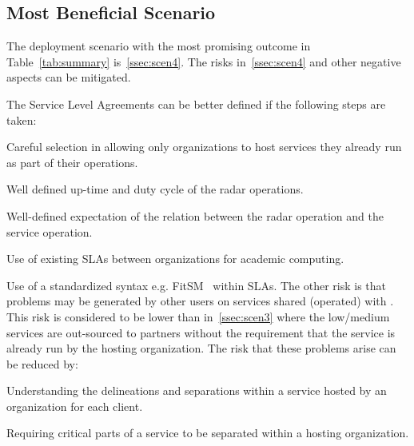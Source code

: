 \documentclass[12pt,a4paper]{article}
\newcommand{\nnt}{NeIC NT1\xspace}
\begin{document}
\subsection{Most Beneficial Scenario}
\label{ssec:best}

The deployment scenario with the most promising outcome in Table~\ref{tab:summary} is~\ref{ssec:scen4}.
The risks in~\ref{ssec:scen4} and other negative aspects can be mitigated. 

The Service Level Agreements can be better defined if the following steps are taken:
\bitm
\item Careful selection in allowing only organizations to host \ED services they already run as part of their operations.
\item Well defined up-time and duty cycle of the \ED radar operations. 
\item Well-defined expectation of the relation between the radar operation and the service operation.
\item Use of existing SLAs between organizations for academic computing.
\item Use of a standardized syntax e.g. FitSM~\cite{fitsm} within SLAs. 
\eitm
The other risk is that problems may be generated by other users on services shared (operated) with \ED.
This risk is considered to be lower than in~\ref{ssec:scen3} where the low/medium services are out-sourced to partners without the requirement that the service is already run by the hosting organization.
The risk that these problems arise can be reduced by:
\bitm
\item Understanding the delineations and separations within a service hosted by an organization for each client.
\item Requiring critical parts of a service to be separated within a hosting organization.
\eitm 
\end{document}
